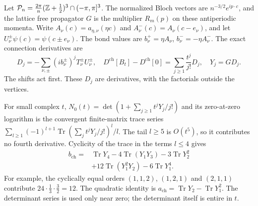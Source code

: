 Let $\mathcal P_n=\frac{2\pi}{n}(\mathbb Z+\frac12)^3\cap(-\pi,\pi]^3$.
The normalized Bloch vectors are $n^{-3/2}e^{ip\cdot c}$,
and the lattice free propagator $G$ is the multiplier
$R_m(p)$ on these antiperiodic momenta. Write
$A_\nu(c)=a_{\eta,\nu}(\eta c)$ and
$A_\nu^-(c)=A_\nu(c-e_\nu)$, and let
$U_\nu^\pm\psi(c)=\psi(c\pm e_\nu)$. The bond values are
$b_\nu^+=\eta A_\nu$, $b_\nu^-=-\eta A_\nu^-$.
The exact connection derivatives are
\begin{equation}\label{eq:response-connection-derivatives}
 D_j=-\sum_{\nu,\pm}(ib_\nu^\pm)^jT_\nu^\pm U_\nu^\pm,
 \quad D^{\mathrm{ch}}[B_t]-D^{\mathrm{ch}}[0]
                  =\sum_{j\ge1}\frac{t^j}{j!}D_j,
 \quad Y_j=GD_j.
\end{equation}
The shifts act first. These $D_j$ are derivatives, with
the factorials outside the vertices.

For small complex $t$, $N_0(t)=\det(1+\sum_{j\ge1}t^jY_j/j!)$
and its zero-at-zero logarithm is the convergent finite-matrix
trace series $\sum_{l\ge1}(-1)^{l+1}\operatorname{Tr}(\sum_j
t^jY_j/j!)^l/l$. The tail $l\ge5$ is $O(t^5)$, so it
contributes no fourth derivative. Cyclicity of the trace
in the terms $l\le4$ gives
\begin{equation}\label{eq:response-fourth-identity}
 \begin{split}
 b_{\mathrm{ch}}={}&\operatorname{Tr}Y_4
       -4\operatorname{Tr}(Y_1Y_3)-3\operatorname{Tr}Y_2^2\\
       &+12\operatorname{Tr}(Y_1^2Y_2)-6\operatorname{Tr}Y_1^4.
 \end{split}
\end{equation}
For example, the cyclically equal orders $(1,1,2)$,
$(1,2,1)$ and $(2,1,1)$ contribute
$24\cdot\frac13\cdot\frac32=12$. The quadratic identity
is $a_{\mathrm{ch}}=\operatorname{Tr}Y_2-\operatorname{Tr}Y_1^2$.
The determinant series is used only near zero; the determinant
itself is entire in $t$.

